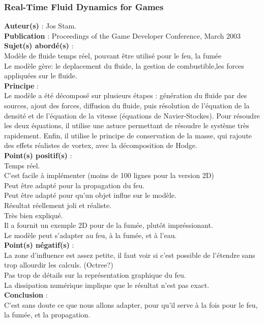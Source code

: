 \documentclass[a4paper,10pt]{article}
\begin{document}
\subsubsection{Real-Time Fluid Dynamics for Games}
\textbf{Auteur(s)} : Jos Stam.\\
\textbf{Publication} : Proceedings of the Game Developer Conference, March 2003 \\
\textbf{Sujet(s) abordé(s)} : \\
    Modèle de fluide temps réel, pouvant être utilisé pour le feu, la fumée\\
	Le modèle gère: le deplacement du fluide, la gestion de combustible,les forces appliquées sur le fluide.\\	
\textbf{Principe} :\\
	Le modèle a été décomposé sur plusieurs étapes : génération du fluide par des sources, ajout des forces, diffusion du fluide, puis résolution de l'équation de la densité et de l'équation de la vitesse (équations de Navier-Stockes).
	Pour résoudre les deux équations, il utilise une astuce permettant de résoudre le système très rapidement.
	Enfin, il utilise le principe de conservation de la masse, qui rajoute des effets réalistes de vortex, avec la décomposition de Hodge.\\
\textbf{Point(s) positif(s)} :\\
	Temps réel.\\
	C'est facile à implémenter (moins de 100 lignes pour la version 2D)\\
	Peut être adapté pour la propagation du feu.\\
	Peut être adapté pour qu'un objet influe sur le modèle.\\
	Résultat réellement joli et réaliste.\\
	Très bien expliqué.\\
	Il a fournit un exemple 2D pour de la fumée, plutôt impréssionant.\\
	Le modèle peut s'adapter au feu, à la fumée, et à l'eau.\\
\textbf{Point(s) négatif(s)} :\\
	La zone d'influence est assez petite, il faut voir si c'est possible de l'étendre sans trop allourdir les calculs. (Octree?) \\
	Pas trop de détails sur la représentation graphique du feu.\\	
	La dissipation numérique implique que le résultat n'est pas exact.\\
\textbf{Conclusion} :\\
	C'est sans doute ce que nous allons adapter, pour qu'il serve à la fois pour le feu, la fumée, et la propagation.
\end{document}
